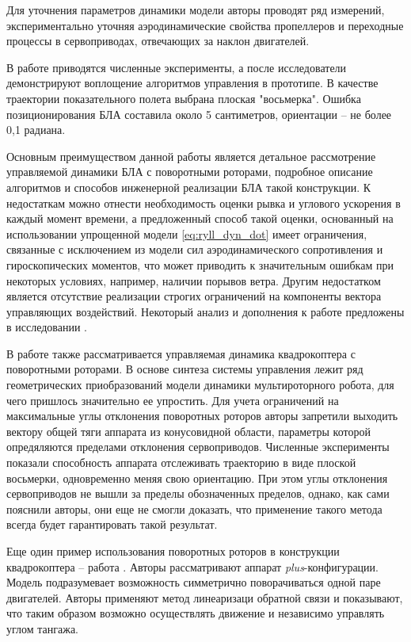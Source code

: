 Для уточнения параметров динамики модели авторы проводят ряд измерений, экспериментально уточняя аэродинамические свойства пропеллеров и переходные процессы в сервоприводах, отвечающих за наклон двигателей.

В работе приводятся численные эксперименты, а после исследователи демонстрируют воплощение алгоритмов управления в прототипе.
В качестве траектории показательного полета выбрана плоская "восьмерка".
Ошибка позиционирования БЛА составила около 5 сантиметров, ориентации -- не более 0,1 радиана.

Основным преимуществом данной работы является детальное рассмотрение управляемой динамики БЛА с поворотными роторами, подробное описание алгоритмов и способов инженерной реализации БЛА такой конструкции.
К недостаткам можно отнести необходимость оценки рывка и углового ускорения в каждый момент времени, а предложенный способ такой оценки, основанный на использовании упрощенной модели \eqref{eq:ryll_dyn_dot} имеет ограничения, связанные с исключением из модели сил аэродинамического сопротивления и гироскопических моментов, что может приводить к значительным ошибкам при некоторых условиях, например, наличии порывов ветра. Другим недостатком является отсутствие реализации строгих ограничений на компоненты вектора управляющих воздействий. Некоторый анализ и дополнения к работе \cite{Ryll01} предложены в исследовании \cite{Stolc01}.

В работе  \cite{Invernizzi01} также рассматривается управляемая динамика квадрокоптера с поворотными роторами. В основе синтеза системы управления лежит ряд геометрических приобразований модели динамики мультироторного робота, для чего пришлось значительно ее упростить.
Для учета ограничений на максимальные углы отклонения поворотных роторов авторы запретили выходить вектору общей тяги аппарата из конусовидной области, параметры которой опредяляются пределами отклонения сервоприводов.
Численные эксперименты показали способность аппарата отслеживать траекторию в виде плоской восьмерки, одновременно меняя свою ориентацию.
При этом углы отклонения сервоприводов не вышли за пределы обозначенных пределов, однако, как сами пояснили авторы, они еще не смогли доказать, что применение такого метода всегда будет гарантировать такой результат.

Еще один пример использования поворотных роторов в конструкции квадрокоптера -- работа \cite{Nemati01}.
Авторы рассматривают аппарат \textit{plus}-конфигурации.
Модель подразумевает возможность симметрично поворачиваться одной паре двигателей.
Авторы применяют метод линеаризаци обратной связи и показывают, что таким образом возможно осуществлять движение и независимо управлять углом тангажа.

